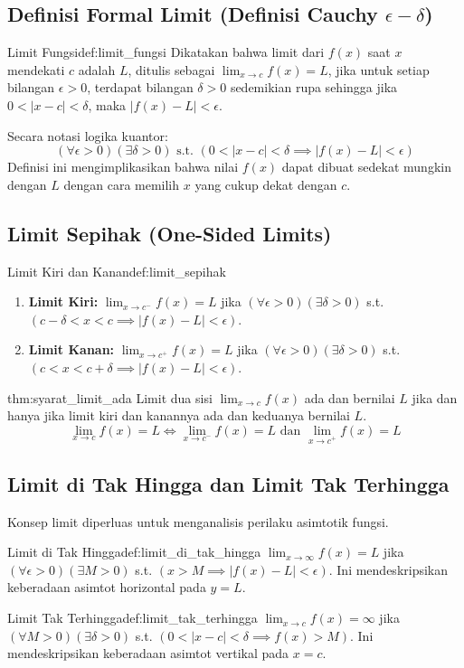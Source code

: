 \documentclass[12pt, a4paper]{article}
\begin{document}
\subsection{Definisi Formal Limit (Definisi Cauchy $\epsilon-\delta$)}
\begin{definition}{Limit Fungsi}{def:limit_fungsi}
Dikatakan bahwa limit dari $f(x)$ saat $x$ mendekati $c$ adalah $L$, ditulis sebagai $\lim_{x \to c} f(x) = L$, jika untuk setiap bilangan $\epsilon > 0$, terdapat bilangan $\delta > 0$ sedemikian rupa sehingga jika $0 < |x-c| < \delta$, maka $|f(x) - L| < \epsilon$.
\end{definition}
Secara notasi logika kuantor:
\[
(\forall \epsilon > 0)(\exists \delta > 0) \text{ s.t. } (0 < |x-c| < \delta \implies |f(x) - L| < \epsilon)
\]
Definisi ini mengimplikasikan bahwa nilai $f(x)$ dapat dibuat sedekat mungkin dengan $L$ dengan cara memilih $x$ yang cukup dekat dengan $c$.

\subsection{Limit Sepihak (One-Sided Limits)}
\begin{definition}{Limit Kiri dan Kanan}{def:limit_sepihak}
\begin{enumerate}
    \item \textbf{Limit Kiri:} $\lim_{x \to c^-} f(x) = L$ jika $(\forall \epsilon > 0)(\exists \delta > 0)$ s.t. $(c - \delta < x < c \implies |f(x) - L| < \epsilon)$.
    \item \textbf{Limit Kanan:} $\lim_{x \to c^+} f(x) = L$ jika $(\forall \epsilon > 0)(\exists \delta > 0)$ s.t. $(c < x < c + \delta \implies |f(x) - L| < \epsilon)$.
\end{enumerate}
\end{definition}

\begin{theorem}{}{thm:syarat_limit_ada}
Limit dua sisi $\lim_{x \to c} f(x)$ ada dan bernilai $L$ jika dan hanya jika limit kiri dan kanannya ada dan keduanya bernilai $L$.
\[
\lim_{x \to c} f(x) = L \iff \lim_{x \to c^-} f(x) = L \text{ dan } \lim_{x \to c^+} f(x) = L
\]
\end{theorem}

\subsection{Limit di Tak Hingga dan Limit Tak Terhingga}
Konsep limit diperluas untuk menganalisis perilaku asimtotik fungsi.
\begin{definition}{Limit di Tak Hingga}{def:limit_di_tak_hingga}
$\lim_{x \to \infty} f(x) = L$ jika $(\forall \epsilon > 0)(\exists M > 0)$ s.t. $(x > M \implies |f(x) - L| < \epsilon)$. Ini mendeskripsikan keberadaan asimtot horizontal pada $y=L$.
\end{definition}
\begin{definition}{Limit Tak Terhingga}{def:limit_tak_terhingga}
$\lim_{x \to c} f(x) = \infty$ jika $(\forall M > 0)(\exists \delta > 0)$ s.t. $(0 < |x-c| < \delta \implies f(x) > M)$. Ini mendeskripsikan keberadaan asimtot vertikal pada $x=c$.
\end{definition}
\end{document}
